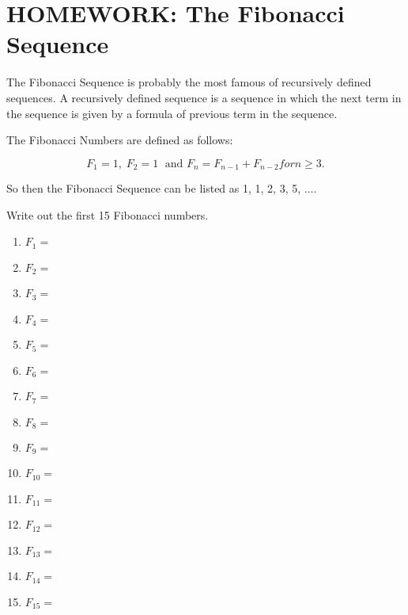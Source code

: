 
\section{HOMEWORK: The Fibonacci Sequence}

The Fibonacci Sequence is probably the most famous of recursively defined sequences. A recursively defined sequence is a sequence in which the next term in the sequence is given by a formula of previous term in the sequence. 

\noindent The Fibonacci Numbers are defined as follows:

\begin{center}
    \begin{equation*}
        F_1 = 1, \; F_2 = 1 \; \text{ and } F_n=F_{n-1}+F_{n-2} {for } n\geq 3.
    \end{equation*}
\end{center}

\noindent So then the Fibonacci Sequence can be listed as 1, 1, 2, 3, 5, $\ldots.$

\begin{exercise}
Write out the first 15 Fibonacci numbers.
\end{exercise}

\begin{multicols}{2}
\begin{enumerate}
    \item $F_1 =$
    \vspace{.25in}
    \item $F_2 =$
    \vspace{.25in}
    \item $F_3 =$
    \vspace{.25in}
    \item $F_4 =$
    \vspace{.25in}
    \item $F_5 =$
    \vspace{.25in}
    \item $F_6 =$
    \vspace{.25in}
    \item $F_7 =$
    \vspace{.25in}
    \item $F_8 =$
    \vspace{.25in}
    \item $F_9 =$
    \vspace{.25in}
    \item $F_{10} =$
    \vspace{.25in} 
    \item $F_{11} =$
    \vspace{.25in}
    \item $F_{12} =$
    \vspace{.25in}
    \item $F_{13} =$
    \vspace{.25in}
    \item $F_{14} =$
    \vspace{.25in}
    \item $F_{15} =$
\end{enumerate}	
\end{multicols}


